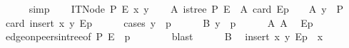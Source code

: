 \begin{isabellebody}
\ \ \ \ \isamarkupfalse%
\ simp\isanewline
{}\isamarkupfalse%
\isanewline
\ \ \isamarkupfalse%
\ {\isacharparenleft}{\kern0pt}ITNode\ P\ E\ x\ y{\isacharparenright}{\kern0pt}\isanewline
\ \ \isamarkupfalse%
\ A{}{\isacharcolon}{\kern0pt}\ {\isachardoublequoteopen}is{\isacharunderscore}{\kern0pt}tree\ P\ E{\isachardoublequoteclose}\ \ A{}{\isacharcolon}{\kern0pt}\ {\isachardoublequoteopen}card\ {\isacharparenleft}{\kern0pt}E{\isasymlangle}{\isasymrightarrow}p{\isasymrangle}{\isacharparenright}{\kern0pt}\ {\isasymle}\ {}{\isachardoublequoteclose}\ \ A{}{\isacharcolon}{\kern0pt}\ {\isachardoublequoteopen}y\ {\isasymnotin}\ P{\isachardoublequoteclose}\isanewline
\ \ \isamarkupfalse%
\ {\isachardoublequoteopen}card\ {\isacharparenleft}{\kern0pt}insert\ {\isacharparenleft}{\kern0pt}x{\isacharcomma}{\kern0pt}\ y{\isacharparenright}{\kern0pt}\ E{\isasymlangle}{\isasymrightarrow}p{\isasymrangle}{\isacharparenright}{\kern0pt}\ {\isasymle}\ {}{\isachardoublequoteclose}\isanewline
\ \ \isamarkupfalse%
\ {\isacharparenleft}{\kern0pt}cases\ {\isachardoublequoteopen}y\ {\isacharequal}{\kern0pt}\ p{\isachardoublequoteclose}{\isacharparenright}{\kern0pt}\isanewline
\ \ \ \ \isamarkupfalse%
\ B{\isacharcolon}{\kern0pt}\ {\isachardoublequoteopen}y\ {\isacharequal}{\kern0pt}\ p{\isachardoublequoteclose}\isanewline
\ \ \ \ \isamarkupfalse%
\ A{}\ A{}\ \isamarkupfalse%
\ {\isachardoublequoteopen}E{\isasymlangle}{\isasymrightarrow}p{\isasymrangle}\ {\isacharequal}{\kern0pt}\ {\isacharbraceleft}{\kern0pt}{\isacharbraceright}{\kern0pt}{\isachardoublequoteclose}\isanewline
\ \ \ \ \ \ \isamarkupfalse%
\ edge{\isacharunderscore}{\kern0pt}on{\isacharunderscore}{\kern0pt}peers{\isacharunderscore}{\kern0pt}in{\isacharunderscore}{\kern0pt}tree{\isacharparenleft}{\kern0pt}{}{\isacharparenright}{\kern0pt}{\isacharbrackleft}{\kern0pt}of\ P\ E\ {\isacharunderscore}{\kern0pt}\ p{\isacharbrackright}{\kern0pt}\isanewline
\ \ \ \ \ \ \isamarkupfalse%
\ blast\isanewline
\ \ \ \ \isamarkupfalse%
\ B\ \isamarkupfalse%
\ {\isachardoublequoteopen}insert\ {\isacharparenleft}{\kern0pt}x{\isacharcomma}{\kern0pt}\ y{\isacharparenright}{\kern0pt}\ E{\isasymlangle}{\isasymrightarrow}p{\isasymrangle}\ {\isacharequal}{\kern0pt}\ {\isacharbraceleft}{\kern0pt}x{\isacharbraceright}{\kern0pt}{\isachardoublequoteclose}\isanewline

\end{isabellebody}
